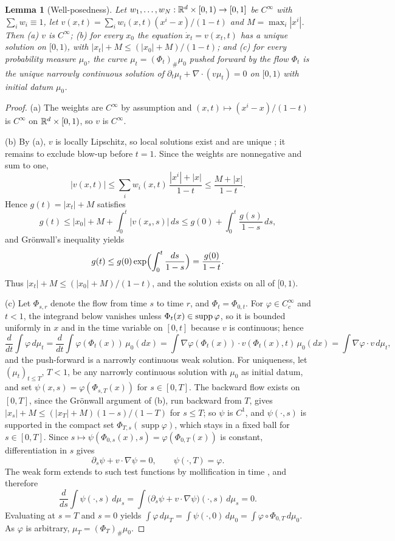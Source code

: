 \documentclass{article} %
\theoremstyle{plain}
\newtheorem{lemma}[theorem]{Lemma}
\theoremstyle{definition}
\theoremstyle{remark}
\begin{document}
\begin{lemma}[Well-posedness]
\label{lem:wellposed}
Let $w_1,\dots,w_N:\mathbb{R}^d\times[0,1)\to[0,1]$ be $C^\infty$ with $\sum_iw_i\equiv1$, let
$v(x,t)=\sum_iw_i(x,t)(x^i-x)/(1-t)$ and $M=\max_i|x^i|$. Then (a) $v$ is $C^\infty$; (b) for
every $x_0$ the equation $\dot x_t=v(x_t,t)$ has a unique solution on $[0,1)$, with
$|x_t|+M\le(|x_0|+M)/(1-t)$; and (c) for every probability measure $\mu_0$, the curve
$\mu_t=(\Phi_t)_\#\mu_0$ pushed forward by the flow $\Phi_t$ is the unique narrowly continuous
solution of $\partial_t\mu_t+\nabla\!\cdot(v\mu_t)=0$ on $[0,1)$ with initial datum $\mu_0$.
\end{lemma}
\begin{proof}
(a) The weights are $C^\infty$ by assumption and $(x,t)\mapsto(x^i-x)/(1-t)$ is $C^\infty$ on
$\mathbb{R}^d\times[0,1)$, so $v$ is $C^\infty$.

(b) By (a), $v$ is locally Lipschitz, so local solutions exist and are unique
\citep[Ch.~II]{hartman2002ode}; it remains to exclude blow-up before $t=1$. Since the weights are
nonnegative and sum to one,
\[
|v(x,t)|\le\sum_iw_i(x,t)\,\frac{|x^i|+|x|}{1-t}\le\frac{M+|x|}{1-t}.
\]
Hence $g(t)=|x_t|+M$ satisfies
\[
g(t)\le|x_0|+M+\int_0^t|v(x_s,s)|\,ds\le g(0)+\int_0^t\frac{g(s)}{1-s}\,ds,
\]
and Gr\"onwall's inequality yields
\[
g(t)\le g(0)\exp\Bigl(\int_0^t\frac{ds}{1-s}\Bigr)=\frac{g(0)}{1-t}.
\]
Thus $|x_t|+M\le(|x_0|+M)/(1-t)$, and the solution exists on all of $[0,1)$.

(c) Let $\Phi_{s,r}$ denote the flow from time $s$ to time $r$, and $\Phi_t=\Phi_{0,t}$. For
$\varphi\in C_c^\infty$ and $t<1$, the integrand below vanishes unless $\Phi_t(x)\in\operatorname{supp}\varphi$,
so it is bounded uniformly in $x$ and in the time variable on $[0,t]$ because $v$ is continuous;
hence
\[
\frac{d}{dt}\int\varphi\,d\mu_t=\frac{d}{dt}\int\varphi(\Phi_t(x))\,\mu_0(dx)
=\int\nabla\varphi(\Phi_t(x))\cdot v(\Phi_t(x),t)\,\mu_0(dx)=\int\nabla\varphi\cdot v\,d\mu_t,
\]
and the push-forward is a narrowly continuous weak solution. For uniqueness, let
$(\mu_t)_{t\le T}$, $T<1$, be any narrowly continuous solution with $\mu_0$ as initial datum, and set
$\psi(x,s)=\varphi(\Phi_{s,T}(x))$ for $s\in[0,T]$. The backward flow exists on $[0,T]$, since the Gr\"onwall
argument of (b), run backward from $T$, gives $|x_s|+M\le(|x_T|+M)(1-s)/(1-T)$ for $s\le T$; so
$\psi$ is $C^1$, and $\psi(\cdot,s)$ is supported in the compact set
$\Phi_{T,s}(\operatorname{supp}\varphi)$, which stays in a fixed ball for $s\in[0,T]$. Since
$s\mapsto\psi(\Phi_{0,s}(x),s)=\varphi(\Phi_{0,T}(x))$ is constant, differentiation in $s$ gives
\[
\partial_s\psi+v\cdot\nabla\psi=0,\qquad\psi(\cdot,T)=\varphi .
\]
The weak form extends to such test functions by mollification in time
\citep[Ch.~8]{ambrosio2008gradient}, and therefore
\[
\frac{d}{ds}\int\psi(\cdot,s)\,d\mu_s=\int\bigl(\partial_s\psi+v\cdot\nabla\psi\bigr)(\cdot,s)\,d\mu_s=0 .
\]
Evaluating at $s=T$ and $s=0$ yields
$\int\varphi\,d\mu_T=\int\psi(\cdot,0)\,d\mu_0=\int\varphi\circ\Phi_{0,T}\,d\mu_0$. As $\varphi$ is
arbitrary, $\mu_T=(\Phi_T)_\#\mu_0$.
\end{proof}
\end{document}
